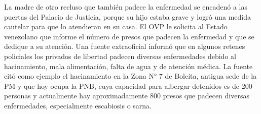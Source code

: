 \documentclass{article}%
\begin{document}
\newline%
%
La madre de otro recluso que también padece la enfermedad se encadenó a las puertas del Palacio de Justicia, porque su hijo estaba grave y logró una medida cautelar para que lo atendieran en su casa.%
\newline%
%
El OVP le solicita al Estado venezolano que informe el número de presos que padecen la enfermedad y que se dedique a su atención.%
\newline%
%
Una fuente extraoficial informó que en algunos retenes policiales los privados de libertad padecen diversas enfermedades debido al hacinamiento, mala alimentación, falta de agua y de atención médica.%
\newline%
%
La fuente citó como ejemplo el hacinamiento en la Zona N° 7 de Boleíta, antigua sede de la PM y que hoy ocupa la PNB, cuya capacidad para albergar detenidos es de 200 personas y actualmente hay aproximadamente 800 presos que padecen diversas enfermedades, especialmente escabiosis o sarna.%
\newline%
%
\end{document}

